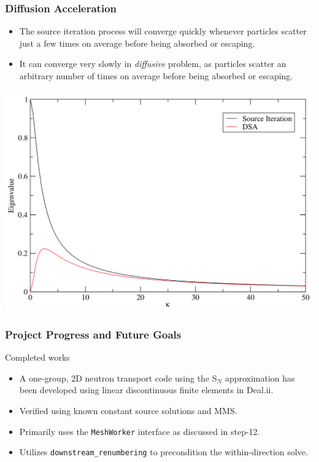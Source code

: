 \documentclass[xcolor={usenames,dvipsnames,svgnames,table}]{beamer}
\begin{document}

\begin{frame}\frametitle{Diffusion Acceleration}
	\begin{minipage}{0.45\linewidth}
		\begin{itemize}
			\item The source iteration process will converge quickly whenever particles scatter just a few times on average before being absorbed or escaping.
			\item It can converge very slowly in \textit{diffusive} problem, as particles scatter an arbitrary number of times on average before being absorbed or escaping.
		\end{itemize}
	\end{minipage}
	\hfill
	\begin{minipage}{0.50\linewidth}
		\includegraphics[width=\linewidth]{images/eigenvalues}
	\end{minipage}
\end{frame}


\begin{frame}\frametitle{Project Progress and Future Goals}
	\begin{block}{Completed works}
		\begin{itemize}
			\item A one-group, 2D neutron transport code using the S$_N$ approximation has been developed using linear discontinuous finite elements in Deal.ii.
			\item Verified using known constant source solutions and MMS.
			\item Primarily uses the \texttt{MeshWorker} interface as discussed in step-12.
			\item Utilizes \texttt{downstream\_renumbering} to precondition the within-direction solve.
		\end{itemize}
	\end{block}
\end{frame}
\end{document}
